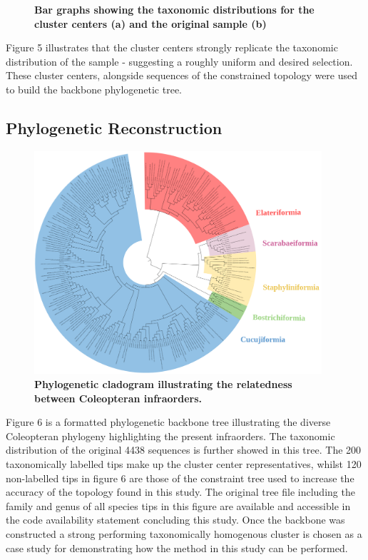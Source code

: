 \documentclass[12pt]{article}
\begin{document}
\begin{figure}[H]
\begin{subfigure}{0.51\textwidth}
{    }
        \caption{}
    \end{subfigure}
    \captionsetup{margin=0.75cm}
      \caption{\textbf{\small Bar graphs showing the taxonomic distributions for the cluster centers (a) and the original sample (b)}}
  \end{figure}

  Figure 5 illustrates that the cluster centers strongly replicate the taxonomic distribution of the sample - suggesting a roughly uniform and desired selection. These cluster centers, alongside sequences of the constrained topology were used to build the backbone phylogenetic tree. 

  \subsection{Phylogenetic Reconstruction}

  \begin{figure}[H]
      \centering
      \includegraphics[width=0.95\textwidth]{bbb.png}
      \captionsetup{margin=0.75cm}
      \caption{\textbf{\small Phylogenetic cladogram illustrating the relatedness between Coleopteran infraorders.}}
  \end{figure}

  Figure 6 is a formatted phylogenetic backbone tree illustrating the diverse Coleopteran phylogeny highlighting the present infraorders. The taxonomic distribution of the original 4438 sequences is further showed in this tree. The 200 taxonomically labelled tips make up the cluster center representatives, whilst 120 non-labelled tips in figure 6 are those of the constraint tree used to increase the accuracy of the topology found in this study. The original tree file including the family and genus of all species tips in this figure are available and accessible in the code availability statement concluding this study. Once the backbone was constructed a strong performing taxonomically homogenous cluster is chosen as a case study for demonstrating how the method in this study can be performed.
\end{document}

